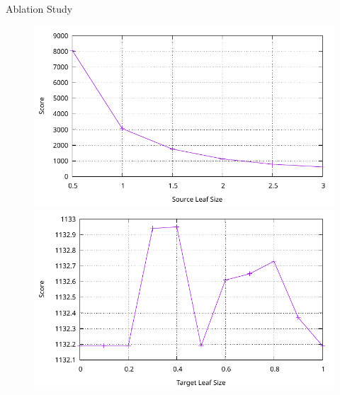 \begin{frame}{Ablation Study}
\begin{figure}
\begin{minipage}{0.49\textwidth}
    \end{minipage}
    \hfill
    \begin{minipage}{0.49\textwidth}
        \centering
        \includegraphics[height=0.25\textheight]{../02-global-localization/plots/src_leaf_size.pdf}
        \includegraphics[height=0.25\textheight]{../02-global-localization/plots/tar_leaf_size.pdf}
    \end{minipage}
\end{figure}
\end{frame}

